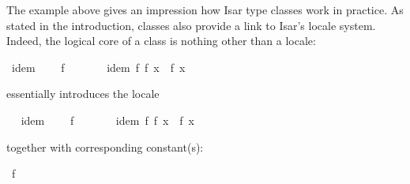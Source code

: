 \begin{isabellebody}
\begin{isamarkuptext}
The example above gives an impression how Isar type classes work in
  practice.  As stated in the introduction, classes also provide a
  link to Isar's locale system.  Indeed, the logical core of a class
  is nothing other than a locale:%
\end{isamarkuptext}%
\isamarkuptrue%
%
\isadelimquote
%
\endisadelimquote
%
\isatagquote
{}\isamarkupfalse%
\ idem\ {}\isanewline
\ \ \ f\ {}{}\ {}{}\ {}\ {}{}\isanewline
\ \ \ idem{}\ {}f\ {}f\ x{}\ {}\ f\ x{}%
\endisatagquote
{\isafoldquote}%
%
\isadelimquote
%
\endisadelimquote
%
\begin{isamarkuptext}%
\noindent essentially introduces the locale%
\end{isamarkuptext}%
\isamarkuptrue%
\ %
\isadeliminvisible
%
\endisadeliminvisible
%
\isataginvisible
%
\endisataginvisible
{\isafoldinvisible}%
%
\isadeliminvisible
%
\endisadeliminvisible
%
\isadelimquote
%
\endisadelimquote
%
\isatagquote
{}\isamarkupfalse%
\ idem\ {}\isanewline
\ \ \ f\ {}{}\ {}{}\ {}\ {}{}\isanewline
\ \ \ idem{}\ {}f\ {}f\ x{}\ {}\ f\ x{}%
\endisatagquote
{\isafoldquote}%
%
\isadelimquote
%
\endisadelimquote
%
\begin{isamarkuptext}%
\noindent together with corresponding constant(s):%
\end{isamarkuptext}%
\isamarkuptrue%
%
\isadelimquote
%
\endisadelimquote
%
\isatagquote
{}\isamarkupfalse%
\ f\ {}{}\ {}{}\ {}\ {}{}%

\end{isabellebody}
